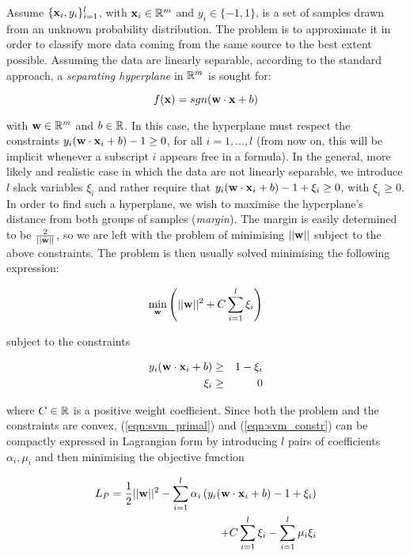 

Assume $\{\mathbf{x}_i,y_i\}_{i=1}^l$, with $\mathbf{x}_i \in \mathbb{R}^m$ and $y_i \in
\{-1,1\}$, is a set of samples drawn from an unknown probability
distribution. The problem is to approximate it in order to classify
more data coming from the same source to the best extent
possible. Assuming the data are linearly separable, according to the
standard approach, a \emph{separating hyperplane} in $\mathbb{R}^m$ is sought
for:

\begin{equation} \label{eqn:dec}
  f(\mathbf{x}) = sgn(\mathbf{w}\cdot\mathbf{x} + b)
\end{equation}

with $\mathbf{w} \in \mathbb{R}^m$ and $b \in \mathbb{R}$. In this case, the hyperplane
must respect the constraints $y_i(\mathbf{w}\cdot\mathbf{x}_i + b)-1\geq 0$, for all
$i = 1,\ldots,l$ (from now on, this will be implicit whenever a
subscript $i$ appears free in a formula). In the general, more likely
and realistic case in which the data are not linearly separable, we
introduce $l$ slack variables $\xi_i$ and rather require that
$y_i(\mathbf{w}\cdot\mathbf{x}_i + b)-1+\xi_i\geq 0$, with $\xi_i \geq 0$. In order
to find such a hyperplane, we wish to maximise the hyperplane's
distance from both groups of samples (\emph{margin}). The margin is
easily determined to be $\frac{2}{||\mathbf{w}||}$, so we are left with the
problem of minimising $||\mathbf{w}||$ subject to the above constraints. The
problem is then usually solved minimising the following expression:

\begin{equation} \label{eqn:svm_primal}
  \min_{\mathbf{w}} \left( ||\mathbf{w}||^2 + C \sum_{i=1}^l \xi_i \right)
\end{equation}

subject to the constraints

\begin{eqnarray} \label{eqn:svm_constr}
  y_i (\mathbf{w}\cdot\mathbf{x}_i + b) & \geq & 1-\xi_i \\
                    \xi_i & \geq & 0 \nonumber
\end{eqnarray}

where $C \in \mathbb{R}$ is a positive weight coefficient. Since both the
problem and the constraints are convex, (\ref{eqn:svm_primal}) and
(\ref{eqn:svm_constr}) can be compactly expressed in Lagrangian form
by introducing $l$ pairs of coefficients $\alpha_i, \mu_i$ and then
minimising the objective function

\begin{eqnarray} \label{eqn:lp1}
  L_P =
      \frac{1}{2} ||\mathbf{w}||^2
    - \sum_{i=1}^l \alpha_i \left(y_i (\mathbf{w}\cdot\mathbf{x}_i+b) - 1 + \xi_i \right) \\
    + C \sum_{i=1}^l \xi_i - \sum_{i=1}^l \mu_i \xi_i \nonumber
\end{eqnarray}

